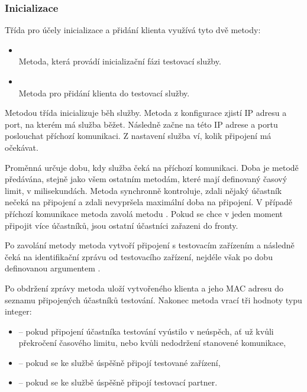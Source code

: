 \subsubsection{Inicializace}

Třída  pro účely inicializace a přidání klienta využívá tyto dvě metody:

\begin{itemize}
    \item {} \\
    Metoda, která provádí inicializační fázi testovací služby.
    \item {}\\
    Metoda pro přidání klienta do testovací služby.
\end{itemize}

Metodou  třída inicializuje běh služby. Metoda z konfigurace zjistí IP adresu a port, na kterém má služba běžet. Následně začne na této IP adrese a portu poslouchat příchozí komunikaci. Z nastavení služba ví, kolik připojení má očekávat. 

Proměnná  určuje dobu, kdy služba čeká na příchozí komunikaci. Doba je metodě předávána, stejně jako všem ostatním metodám, které mají definovaný časový limit, v milisekundách. Metoda synchronně kontroluje, zdali nějaký účastník nečeká na připojení a zdali nevypršela maximální doba na připojení. V případě příchozí komunikace metoda zavolá metodu . Pokud se chce v jeden moment připojit více účastníků, jsou ostatní účastníci zařazeni do fronty.

Po zavolání metody  metoda vytvoří připojení s testovacím zařízením a následně čeká na identifikační zprávu od testovacího zařízení, nejdéle však po dobu definovanou argumentem . 

Po obdržení zprávy metoda uloží vytvořeného klienta a jeho MAC adresu do seznamu připojených účastníků testování. Nakonec metoda vrací tři hodnoty typu integer:
\begin{itemize}
    \item {} -- pokud připojení účastníka testování vyústilo v neúspěch, ať už kvůli překročení časového limitu, nebo kvůli nedodržení stanovené komunikace,
    \item {} -- pokud se ke službě úspěšně připojí testované zařízení,
    \item {} -- pokud se ke službě úspěšně připojí testovací partner.
\end{itemize}

